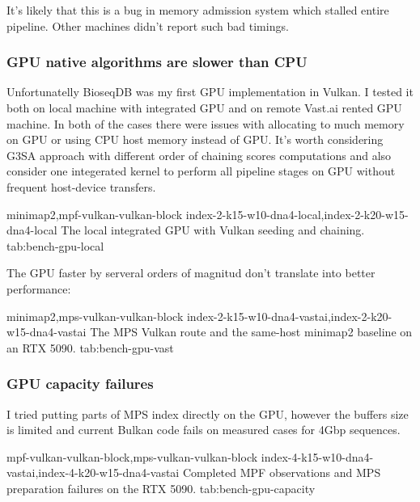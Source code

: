 It's likely that this is a bug in memory admission system which stalled entire pipeline. Other machines didn't report such bad timings.

\subsubsection{GPU native algorithms are slower than CPU}
\label{sec:bench-gpu-performance}

Unfortunatelly BioseqDB was my first GPU implementation in Vulkan. I tested it both on local machine with integrated GPU and on remote Vast.ai rented GPU machine.
In both of the cases there were issues with allocating to much memory on GPU or using CPU host memory instead of GPU.
It's worth considering G3SA approach with different order of chaining scores computations and also consider one integerated kernel to perform all pipeline stages on GPU without frequent host-device
transfers.


  {minimap2,mpf-vulkan-vulkan-block}
  {index-2-k15-w10-dna4-local,index-2-k20-w15-dna4-local}
  {The local integrated GPU with Vulkan seeding and chaining.}
  {tab:bench-gpu-local}

The GPU faster by serveral orders of magnitud don't translate into better performance:

  {minimap2,mps-vulkan-vulkan-block}
  {index-2-k15-w10-dna4-vastai,index-2-k20-w15-dna4-vastai}
  {The MPS Vulkan route and the same-host minimap2 baseline on an RTX 5090.}
  {tab:bench-gpu-vast}


\subsubsection{GPU capacity failures}
\label{sec:bench-gpu-capacity}

I tried putting parts of MPS index directly on the GPU, however the buffers size is limited and current Bulkan code fails on measured cases for 4Gbp sequences.

  {mpf-vulkan-vulkan-block,mps-vulkan-vulkan-block}
  {index-4-k15-w10-dna4-vastai,index-4-k20-w15-dna4-vastai}
  {Completed MPF observations and MPS preparation failures on the RTX 5090.}
  {tab:bench-gpu-capacity}

\clearpage
\endgroup
